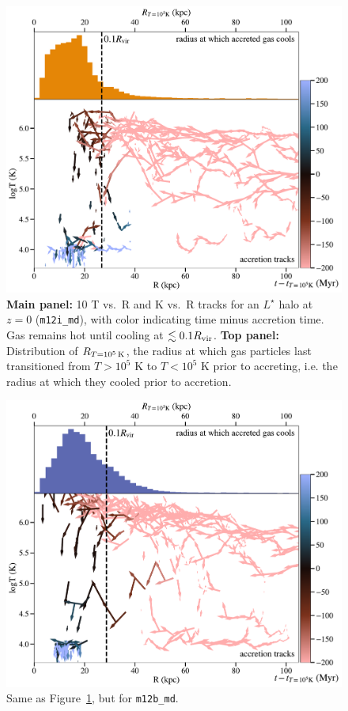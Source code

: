 \documentclass[fleqn,usenatbib]{mnras}
\newcommand{\Rcool}{R_{T=10^5\,{\rm K}}}
\begin{document}
\begin{figure}
    \centering
    \includegraphics[width=\columnwidth]{figures/tracks_m12i_md.pdf}
    \caption{
    \textbf{Main panel:} 10 T vs.\ R and K vs.\ R tracks for an $L^\star$ halo at $z=0$ (\texttt{m12i\_md}), with color indicating time minus accretion time.
    Gas remains hot until cooling at $\lesssim 0.1 R_{\rm vir}$.
    \textbf{Top panel:} Distribution of $\Rcool$, the radius at which gas particles last transitioned from $T > 10^5$ K to $T < 10^5$ K prior to accreting, i.e. the radius at which they cooled prior to accretion.
    }
    \label{f: T vs R}
\end{figure}

\begin{figure}
    \centering
    \includegraphics[width=\columnwidth]{figures/tracks_m12b_md.pdf}
    \caption{
    Same as Figure~\ref{f: T vs R}, but for \texttt{m12b\_md}.
    }
    \label{f: T vs R m12b_md}
\end{figure}
\end{document}

